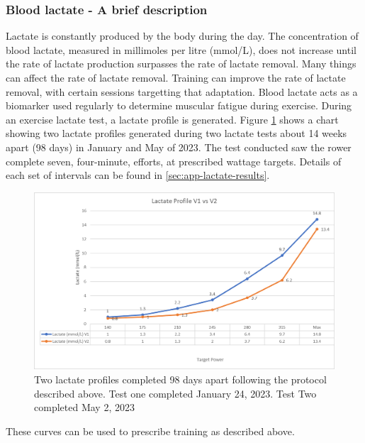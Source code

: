 \subsubsection{Blood lactate - A brief description}
Lactate is constantly produced by the body during the day. The concentration of blood lactate, measured in millimoles per litre (mmol/L), does not increase until the rate of lactate production surpasses the rate of lactate removal. Many things can affect the rate of lactate removal. Training can improve the rate of lactate removal, with certain sessions targetting that adaptation. Blood lactate acts as a biomarker used regularly to determine muscular fatigue during exercise. During an exercise lactate test, a lactate profile is generated. Figure \ref{fig:lactateGraph} shows a chart showing two lactate profiles generated during two lactate tests about 14 weeks apart (98 days) in January and May of 2023. The test conducted saw the rower complete seven, four-minute, efforts, at prescribed wattage targets. Details of each set of intervals can be found in \ref{sec:app-lactate-results}.
\begin{figure}
  \centering
  \includegraphics[width=\linewidth]{figures/lactateGraph.png}
  \caption[Lactate Profiles from January and May 2023]{Two lactate profiles completed 98 days apart following the protocol described above. Test one completed January 24, 2023. Test Two completed May 2, 2023}
  \label{fig:lactateGraph}
\end{figure}
These curves can be used to prescribe training as described above.

